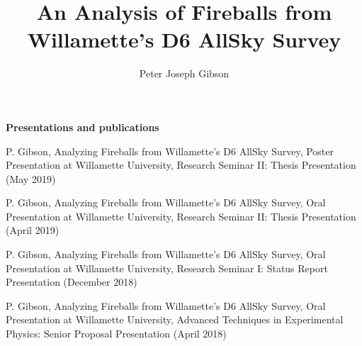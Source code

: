 \documentclass[12pt]{report}
\begin{document}
\title{An Analysis of Fireballs from Willamette's D6 AllSky Survey}
\author{Peter Joseph Gibson}

\maketitle


\newpage

\begin{center}
\textbf{Presentations and publications}

P. Gibson, Analyzing Fireballs from Willamette's D6 AllSky Survey, Poster Presentation at Willamette University, Research Seminar II: Thesis Presentation (May 2019)
\bigskip


P. Gibson, Analyzing Fireballs from Willamette's D6 AllSky Survey, Oral Presentation at Willamette University, Research Seminar II: Thesis Presentation (April 2019)
\bigskip

P. Gibson, Analyzing Fireballs from Willamette's D6 AllSky Survey, Oral Presentation at Willamette University, Research Seminar I: Status Report Presentation (December 2018)
\bigskip

P. Gibson, Analyzing Fireballs from Willamette's D6 AllSky Survey, Oral Presentation at Willamette University, Advanced Techniques in Experimental Physics: Senior Proposal Presentation (April 2018)

\end{center}



\begin{acknowledgments}

\end{acknowledgments}

\begin{abstract}

\end{abstract}

\tableofcontents
\listoffigures





%
%

%
%
%
\printbibliography

%
\end{document}
